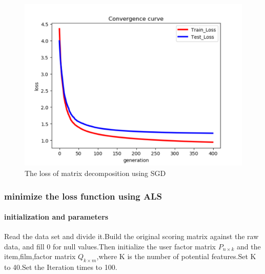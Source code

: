 \documentclass[journal, a4paper]{IEEEtran}
\begin{document}
\begin{figure}[!hbt]
		\begin{center}
		\includegraphics[width=\columnwidth]{lab4-SGD}
		\caption{The loss of matrix decomposition using SGD}
		\label{fig:tf_plot}
		\end{center}
\end{figure}
\subsubsection{minimize the loss function using ALS}
\paragraph{initialization and parameters}
Read the data set and divide it.Build the original scoring matrix against the raw data, and fill 0 for null values.Then initialize the user factor matrix $P_{n\times k}$ and the item,film,factor matrix $Q_{k\times m}$,where K is the number of potential features.Set K to 40.Set the Iteration times to 100.
\end{document}
